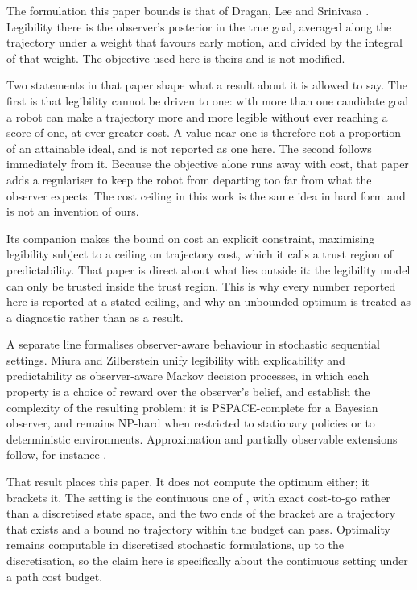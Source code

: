 \documentclass[journal]{IEEEtran}
\begin{document}
The formulation this paper bounds is that of Dragan, Lee and Srinivasa
\cite{dragan2013legibility}. Legibility there is the observer's posterior in
the true goal, averaged along the trajectory under a weight that favours early
motion, and divided by the integral of that weight. The objective used here is
theirs and is not modified.

Two statements in that paper shape what a result about it is allowed to say.
The first is that legibility cannot be driven to one: with more than one
candidate goal a robot can make a trajectory more and more legible without
ever reaching a score of one, at ever greater cost. A value near one is
therefore not a proportion of an attainable ideal, and is not reported as one
here. The second follows immediately from it. Because the objective alone runs
away with cost, that paper adds a regulariser to keep the robot from departing
too far from what the observer expects. The cost ceiling in this work is the
same idea in hard form and is not an invention of ours.

Its companion \cite{dragan2013generating} makes the bound on cost an explicit
constraint, maximising legibility subject to a ceiling on trajectory cost,
which it calls a trust region of predictability. That paper is direct about
what lies outside it: the legibility model can only be trusted inside the
trust region. This is why every number reported here is reported at a stated
ceiling, and why an unbounded optimum is treated as a diagnostic rather than
as a result.

A separate line formalises observer-aware behaviour in stochastic sequential
settings. Miura and Zilberstein \cite{miura2021unifying} unify legibility with
explicability and predictability as observer-aware Markov decision processes,
in which each property is a choice of reward over the observer's belief, and
establish the complexity of the resulting problem: it is PSPACE-complete for a
Bayesian observer, and remains NP-hard when restricted to stationary policies
or to deterministic environments. Approximation and partially observable
extensions follow, for instance \cite{lepers2025observer}.

That result places this paper. It does not compute the optimum either; it
brackets it. The setting is the continuous one of
\cite{dragan2013legibility}, with exact cost-to-go rather than a discretised
state space, and the two ends of the bracket are a trajectory that exists and a
bound no trajectory within the budget can pass. Optimality remains computable
in discretised stochastic formulations, up to the discretisation, so the claim
here is specifically about the continuous setting under a path cost budget.
\end{document}
